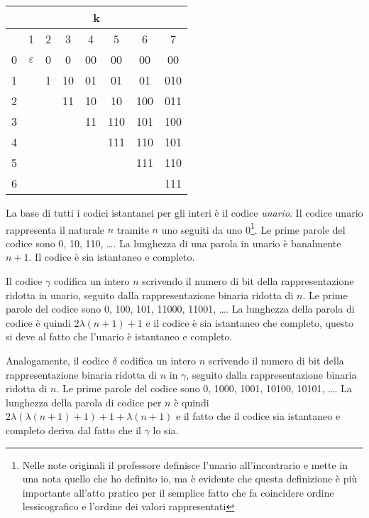 \begin{table}[ht]
	\centering
	\begin{tabular}{|c||c|c|c|c|c|c|c|}
		\hline
		\multicolumn{8}{|c|}{k}                           \\
		\hline
		  & 1             & 2 & 3  & 4  & 5   & 6   & 7   \\
		\hline
		0 & $\varepsilon$ & 0 & 0  & 00 & 00  & 00  & 00  \\
		1 &               & 1 & 10 & 01 & 01  & 01  & 010 \\
		2 &               &   & 11 & 10 & 10  & 100 & 011 \\
		3 &               &   &    & 11 & 110 & 101 & 100 \\
		4 &               &   &    &    & 111 & 110 & 101 \\
		5 &               &   &    &    &     & 111 & 110 \\
		6 &               &   &    &    &     &     & 111 \\
		\hline
	\end{tabular}
\end{table}
\noindent La base di tutti i codici istantanei per gli interi è il codice \textit{unario}. Il codice unario rappresenta il naturale $n$ tramite $n$ uno seguiti da uno 0\footnote{Nelle note originali il professore definisce l'unario all'incontrario e mette in una nota quello che ho definito io, ma è evidente che questa definizione è più importante all'atto pratico per il semplice fatto che fa coincidere ordine lessicografico e l'ordine dei valori rappresentati}. Le prime parole del codice sono 0, 10, 110, \dots. La lunghezza di una parola in unario è banalmente $n + 1$. Il codice è sia istantaneo e completo.

Il codice $\gamma$ \cite{elias} codifica un intero $n$ scrivendo il numero di bit della rappresentazione ridotta in unario, seguito dalla rappresentazione binaria ridotta di $n$. Le prime parole del codice sono 0, 100, 101, 11000, 11001, \dots. La lunghezza della parola di codice è quindi $2\lambda(n + 1) + 1$ e il codice è sia istantaneo che completo, questo si deve al fatto che l'unario è istantaneo e completo.

Analogamente, il codice $\delta$ \cite{elias} codifica un intero $n$ scrivendo il numero di bit della rappresentazione binaria ridotta di $n$ in $\gamma$, seguito dalla rappresentazione binaria ridotta di $n$. Le prime parole del codice sono 0, 1000, 1001, 10100, 10101, \dots. La lunghezza della parola di codice per $n$ è quindi $2\lambda(\lambda(n + 1) + 1) + 1 + \lambda(n + 1)$ e il fatto che il codice sia istantaneo e completo deriva dal fatto che il $\gamma$ lo sia.

